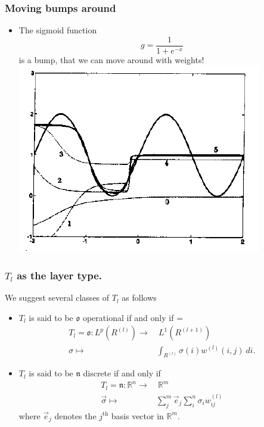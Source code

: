 \documentclass{beamer}
\begin{document}
\begin{frame}
	\frametitle{Moving bumps around}
	\begin{itemize}
		\item The sigmoid function 
		\begin{equation}
			g = \frac{1}{1 + e^{-x}}
		\end{equation}
		is a bump, that we can move around with weights!
		\centering
		\includegraphics{20100524225320564.png}
	\end{itemize}
\end{frame}

\begin{frame}
	\frametitle{$T_l$ as the layer type.}
	\begin{definition}
We suggest several classes of $T_l$ as follows
  \begin{itemize}
  \item $T_l$ is said to be $\mathfrak{o}$ operational if and only if 
   =  \begin{equation} \label{eq:tlfunctional}
    \begin{aligned} 
      T_l = \mathfrak{o}: L^p(R^{(l)}) \to&\ L^1(R^{(l+1)}) \\
      \sigma \mapsto& \int_{R^{(l)}} \sigma(i) w^{(l)}(i,j)\ di.
    \end{aligned}
    \end{equation}
  \item $T_l$ is said to be $\mathfrak{n}$ discrete if and only if 
    \begin{equation} \label{eq:tldiscrete}
    \begin{aligned} 
      T_l = \mathfrak{n}: \mathbb{R}^n \to&\ \mathbb{R}^m \\
      \vec{\sigma} \mapsto& \sum_j^m \vec{e}_j\sum_i^n \sigma_i w^{(l)}_{ij}
    \end{aligned}
    \end{equation}
    where $\vec{e}_j$ denotes the $j^\mathrm{th}$ basis vector in $\mathbb{R}^m$.
  \end{itemize}
\end{definition}
\end{frame}
\end{document}
